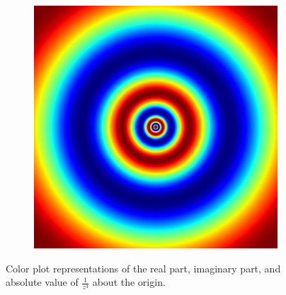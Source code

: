 \begin{figure}
\begin{subfigure}{.32\textwidth}
\end{subfigure}
\begin{subfigure}{.32\textwidth}
\includegraphics[width=\textwidth]{inv4_abs.png}
\end{subfigure}
\caption{Color plot representations of the real part, imaginary part, and absolute value of $\frac{1}{z^4}$ about the origin.}
\label{fig:inv4_color}
\end{figure}


